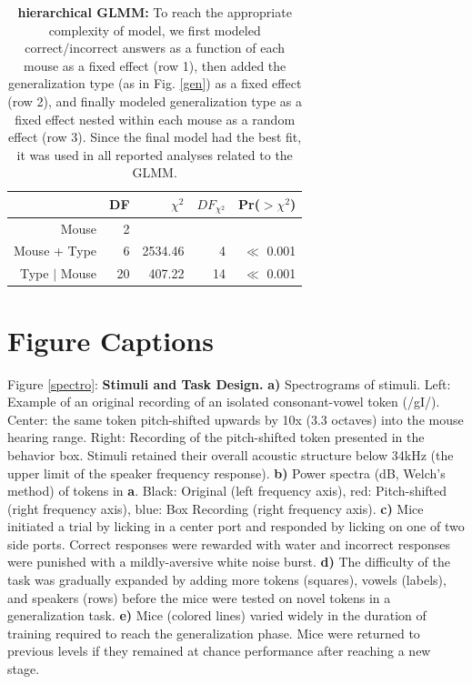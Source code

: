 \newpage
\begin{table}
\label{hiertab}
\caption{\textbf{hierarchical GLMM:} To reach the appropriate complexity of model, we first modeled correct/incorrect answers as a function of each mouse as a fixed effect (row 1), then added the generalization type (as in Fig. \ref{gen}) as a fixed effect (row 2), and finally modeled generalization type as a fixed effect nested within each mouse as a random effect (row 3). Since the final model had the best fit, it was used in all reported analyses related to the GLMM.}
\begin{ruledtabular}
\begin{tabular}{rrrrr}
  \hline
 & DF & $\chi^2$ & $DF_{\chi^2}$ & Pr($>\chi^2$) \\ 
  \hline
Mouse & 2 &  &  &  \\ 
  Mouse + Type & 6 & 2534.46 & 4 & $\ll$ 0.001 \\ 
  Type $|$ Mouse & 20 & 407.22 & 14 & $\ll$ 0.001 \\ 
   \hline
\end{tabular}

\end{ruledtabular}
\end{table}
\clearpage

\section{Figure Captions}

Figure \ref{spectro}: \textbf{Stimuli and Task Design.} \textbf{a)} Spectrograms of stimuli. Left: Example of an original recording of an isolated consonant-vowel token (/gI/). Center: the same token pitch-shifted upwards by 10x (3.3 octaves) into the mouse hearing range. Right: Recording of the pitch-shifted token presented in the behavior box. Stimuli retained their overall acoustic structure below 34kHz (the upper limit of the speaker frequency response). \textbf{b)} Power spectra (dB, Welch's method) of tokens in \textbf{a}. Black: Original (left frequency axis), red: Pitch-shifted (right frequency axis), blue: Box Recording (right frequency axis). \textbf{c)} Mice initiated a trial by licking in a center port and responded by licking on one of two side ports. Correct responses were rewarded with water and incorrect responses were punished with a mildly-aversive white noise burst. \textbf{d)} The difficulty of the task was gradually expanded by adding more tokens (squares), vowels (labels), and speakers (rows) before the mice were tested on novel tokens in a generalization task. \textbf{e)} Mice (colored lines) varied widely in the duration of training required to reach the generalization phase. Mice were returned to previous levels if they remained at chance performance after reaching a new stage.

